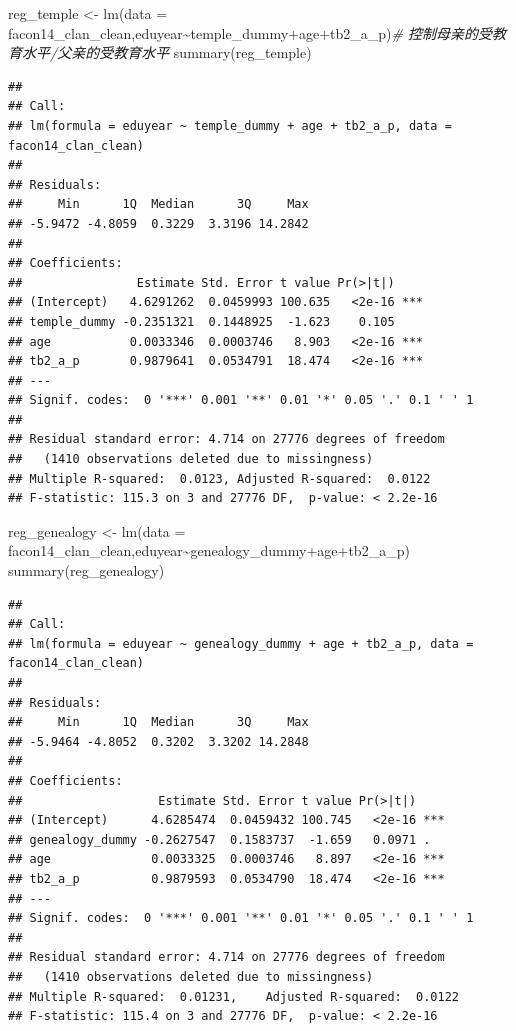 \documentclass[
  oneside]{book}
\newenvironment{Shaded}{\begin{snugshade}}{\end{snugshade}}
\newcommand{\AttributeTok}[1]{\textcolor[rgb]{0.77,0.63,0.00}{#1}}
\newcommand{\CommentTok}[1]{\textcolor[rgb]{0.56,0.35,0.01}{\textit{#1}}}
\newcommand{\FunctionTok}[1]{\textcolor[rgb]{0.00,0.00,0.00}{#1}}
\newcommand{\NormalTok}[1]{#1}
\newcommand{\OtherTok}[1]{\textcolor[rgb]{0.56,0.35,0.01}{#1}}
\newcommand{\SpecialCharTok}[1]{\textcolor[rgb]{0.00,0.00,0.00}{#1}}
\begin{document}
\begin{Shaded}
\begin{Highlighting}[]
\NormalTok{reg\_temple }\OtherTok{\textless{}{-}} \FunctionTok{lm}\NormalTok{(}\AttributeTok{data =}\NormalTok{ facon14\_clan\_clean,eduyear}\SpecialCharTok{\textasciitilde{}}\NormalTok{temple\_dummy}\SpecialCharTok{+}\NormalTok{age}\SpecialCharTok{+}\NormalTok{tb2\_a\_p)}\CommentTok{\# 控制母亲的受教育水平/父亲的受教育水平}
\FunctionTok{summary}\NormalTok{(reg\_temple)}
\end{Highlighting}
\end{Shaded}

\begin{verbatim}
## 
## Call:
## lm(formula = eduyear ~ temple_dummy + age + tb2_a_p, data = facon14_clan_clean)
## 
## Residuals:
##     Min      1Q  Median      3Q     Max 
## -5.9472 -4.8059  0.3229  3.3196 14.2842 
## 
## Coefficients:
##                Estimate Std. Error t value Pr(>|t|)    
## (Intercept)   4.6291262  0.0459993 100.635   <2e-16 ***
## temple_dummy -0.2351321  0.1448925  -1.623    0.105    
## age           0.0033346  0.0003746   8.903   <2e-16 ***
## tb2_a_p       0.9879641  0.0534791  18.474   <2e-16 ***
## ---
## Signif. codes:  0 '***' 0.001 '**' 0.01 '*' 0.05 '.' 0.1 ' ' 1
## 
## Residual standard error: 4.714 on 27776 degrees of freedom
##   (1410 observations deleted due to missingness)
## Multiple R-squared:  0.0123, Adjusted R-squared:  0.0122 
## F-statistic: 115.3 on 3 and 27776 DF,  p-value: < 2.2e-16
\end{verbatim}

\begin{Shaded}
\begin{Highlighting}[]
\NormalTok{reg\_genealogy }\OtherTok{\textless{}{-}} \FunctionTok{lm}\NormalTok{(}\AttributeTok{data =}\NormalTok{ facon14\_clan\_clean,eduyear}\SpecialCharTok{\textasciitilde{}}\NormalTok{genealogy\_dummy}\SpecialCharTok{+}\NormalTok{age}\SpecialCharTok{+}\NormalTok{tb2\_a\_p)}
\FunctionTok{summary}\NormalTok{(reg\_genealogy)}
\end{Highlighting}
\end{Shaded}

\begin{verbatim}
## 
## Call:
## lm(formula = eduyear ~ genealogy_dummy + age + tb2_a_p, data = facon14_clan_clean)
## 
## Residuals:
##     Min      1Q  Median      3Q     Max 
## -5.9464 -4.8052  0.3202  3.3202 14.2848 
## 
## Coefficients:
##                   Estimate Std. Error t value Pr(>|t|)    
## (Intercept)      4.6285474  0.0459432 100.745   <2e-16 ***
## genealogy_dummy -0.2627547  0.1583737  -1.659   0.0971 .  
## age              0.0033325  0.0003746   8.897   <2e-16 ***
## tb2_a_p          0.9879593  0.0534790  18.474   <2e-16 ***
## ---
## Signif. codes:  0 '***' 0.001 '**' 0.01 '*' 0.05 '.' 0.1 ' ' 1
## 
## Residual standard error: 4.714 on 27776 degrees of freedom
##   (1410 observations deleted due to missingness)
## Multiple R-squared:  0.01231,    Adjusted R-squared:  0.0122 
## F-statistic: 115.4 on 3 and 27776 DF,  p-value: < 2.2e-16
\end{verbatim}
\end{document}
